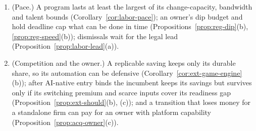 \begin{proposition}
\begin{enumerate}
\item[(g)] (Pace.) A program lasts at least the largest of its change-capacity, bandwidth and talent bounds (Corollary~\ref{cor:labor-pace}); an owner's dip budget and hold deadline cap what can be done in time (Propositions~\ref{prop:reg-dip}(b), \ref{prop:reg-speed}(b)); dismissals wait for the legal lead (Proposition~\ref{prop:labor-lead}(a)).
\item[(h)] (Competition and the owner.) A replicable saving keeps only its durable share, so its automation can be defensive (Corollary~\ref{cor:ext-game-engine}(b)); after AI-native entry binds the incumbent keeps its savings but survives only if its switching premium and scarce inputs cover its readiness gap (Proposition~\ref{prop:ext-should}(b), (c)); and a transition that loses money for a standalone firm can pay for an owner with platform capability (Proposition~\ref{prop:acq-owner}(c)).
\end{enumerate}
\end{proposition}

